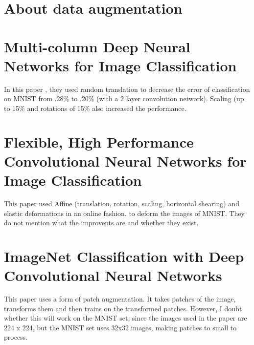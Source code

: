 \documentclass{article}
\begin{document}
\section*{About data augmentation}
\section{Multi-column Deep Neural Networks for Image Classification}
In this paper \cite{ciregan2012multi}, they used random translation to decrease the error of classification on MNIST from .28\% to .20\% (with a 2 layer convolution network). Scaling (up to 15\% and rotations of 15\% also increased the performance.


\section{Flexible, High Performance Convolutional Neural Networks for Image Classification} 
This paper \cite{ciresan2011flexible} used Affine (translation, rotation, scaling, horizontal shearing) and elastic deformations in an online fashion. to deform the images of MNIST. They do not mention what the improvents are and whether they exist.

\section{ImageNet Classification with Deep Convolutional Neural Networks}
This paper \cite{krizhevsky2012imagenet} uses a form of patch augmentation. It takes patches of the image, transforms them and then trains on the transformed patches.
However, I doubt whether this will work on the MNIST set, since the images used in the paper are 224 x 224, but the MNIST set uses 32x32 images, making patches to small to process.
\end{document}
